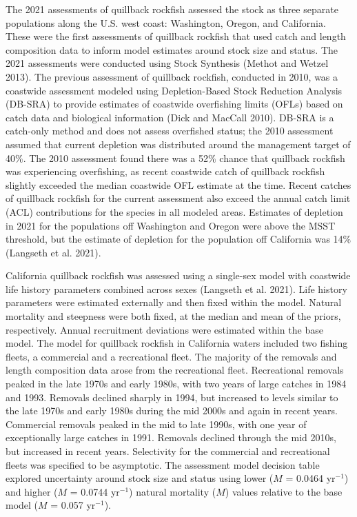 \documentclass[11pt,
  letterpaper,
]{article}
\begin{document}
The 2021 assessments of quillback rockfish assessed the stock as three separate populations along the U.S. west coast: Washington, Oregon, and California. These were the first assessments of quillback rockfish that used catch and length composition data to inform model estimates around stock size and status. The 2021 assessments were conducted using Stock Synthesis (Methot and Wetzel 2013). The previous assessment of quillback rockfish, conducted in 2010, was a coastwide assessment modeled using Depletion-Based Stock Reduction Analysis (DB-SRA) to provide estimates of coastwide overfishing limits (OFLs) based on catch data and biological information (Dick and MacCall 2010). DB-SRA is a catch-only method and does not assess overfished status; the 2010 assessment assumed that current depletion was distributed around the management target of 40\(\%\). The 2010 assessment found there was a 52\(\%\) chance that quillback rockfish was experiencing overfishing, as recent coastwide catch of quillback rockfish slightly exceeded the median coastwide OFL estimate at the time. Recent catches of quillback rockfish for the current assessment also exceed the annual catch limit (ACL) contributions for the species in all modeled areas. Estimates of depletion in 2021 for the populations off Washington and Oregon were above the MSST threshold, but the estimate of depletion for the population off California was 14\(\%\) (Langseth et al. 2021).

California quillback rockfish was assessed using a single-sex model with coastwide life history parameters combined across sexes (Langseth et al. 2021). Life history parameters were estimated externally and then fixed within the model. Natural mortality and steepness were both fixed, at the median and mean of the priors, respectively. Annual recruitment deviations were estimated within the base model. The model for quillback rockfish in California waters included two fishing fleets, a commercial and a recreational fleet. The majority of the removals and length composition data arose from the recreational fleet. Recreational removals peaked in the late 1970s and early 1980s, with two years of large catches in 1984 and 1993. Removals declined sharply in 1994, but increased to levels similar to the late 1970s and early 1980s during the mid 2000s and again in recent years. Commercial removals peaked in the mid to late 1990s, with one year of exceptionally large catches in 1991. Removals declined through the mid 2010s, but increased in recent years. Selectivity for the commercial and recreational fleets was specified to be asymptotic. The assessment model decision table explored uncertainty around stock size and status using lower (\(M\) = 0.0464 yr\(^{-1}\)) and higher (\(M\) = 0.0744 yr\(^{-1}\)) natural mortality (\(M\)) values relative to the base model (\(M\) = 0.057 yr\(^{-1}\)).
\end{document}
